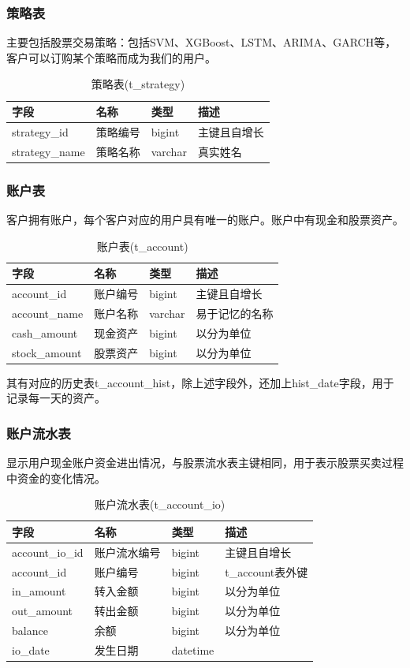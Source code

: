 \documentclass{article}
\begin{document}
\subsubsection{策略表}
主要包括股票交易策略：包括SVM、XGBoost、LSTM、ARIMA、GARCH等，客户可以订购某个策略而成为我们的用户。
\begin{table}[H]
    \caption{策略表(t\_strategy)}
    \label{t000002}
    \begin{tabular}{|p{2cm}|p{3cm}|p{2cm}|p{5cm}|} \hline
        字段 & 名称 & 类型 & 描述 \\ \hline 
        strategy\_id & 策略编号 & bigint & 主键且自增长 \\ \hline
        strategy\_name & 策略名称 & varchar & 真实姓名 \\ \hline
    \end{tabular}
\end{table}
\subsubsection{账户表}
客户拥有账户，每个客户对应的用户具有唯一的账户。账户中有现金和股票资产。
\begin{table}[H]
    \caption{账户表(t\_account)}
    \label{t000003}
    \begin{tabular}{|p{2cm}|p{3cm}|p{2cm}|p{5cm}|} \hline
        字段 & 名称 & 类型 & 描述 \\ \hline 
        account\_id & 账户编号 & bigint & 主键且自增长 \\ \hline
        account\_name & 账户名称 & varchar & 易于记忆的名称 \\ \hline
        cash\_amount & 现金资产 & bigint & 以分为单位 \\ \hline
        stock\_amount & 股票资产 & bigint & 以分为单位 \\ \hline
    \end{tabular}
\end{table}
其有对应的历史表t\_account\_hist，除上述字段外，还加上hist\_date字段，用于记录每一天的资产。
\subsubsection{账户流水表}
显示用户现金账户资金进出情况，与股票流水表主键相同，用于表示股票买卖过程中资金的变化情况。
\begin{table}[H]
    \caption{账户流水表(t\_account\_io)}
    \label{t000004}
    \begin{tabular}{|p{2cm}|p{3cm}|p{2cm}|p{5cm}|} \hline
        字段 & 名称 & 类型 & 描述 \\ \hline 
        account\_io\_id & 账户流水编号 & bigint & 主键且自增长 \\ \hline
        account\_id & 账户编号 & bigint & t\_account表外键 \\ \hline
        in\_amount & 转入金额 & bigint & 以分为单位 \\ \hline
        out\_amount & 转出金额 & bigint & 以分为单位 \\ \hline
        balance & 余额 & bigint & 以分为单位  \\ \hline
        io\_date & 发生日期 & datetime & \\ \hline
    \end{tabular}
\end{table}
\end{document}
